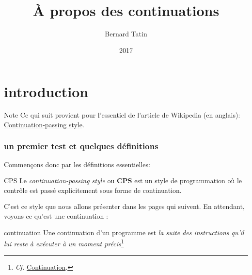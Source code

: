 \documentclass[A4,12pt]{scrartcl}%
\author{Bernard Tatin}
\date{2017}
\title{À propos des continuations}
\begin{document}
\maketitle
{}

\tableofcontents

\part{introduction}


\begin{note}{Note}
Ce qui suit provient pour l'essentiel de l'article de Wikipedia (en anglais): \href{https://en.wikipedia.org/wiki/Continuation-passing_style}{Continuation-passing style}.
\end{note}

\section{un premier test et quelques définitions}
Commençons donc par les définitions essentielles:

\begin{termdefinition}{CPS}
Le \emph{continuation-passing style} ou \textbf{CPS} est un style de programmation où le contrôle est passé explicitement sous forme de continuation.
\end{termdefinition}

C'est ce style que nous allons présenter dans les pages qui suivent. En attendant, voyons ce qu'est une continuation :

\begin{termdefinition}{continuation}
Une continuation d'un programme est \emph{la suite des instructions qu'il lui reste à exécuter à un moment précis}\footnote{\emph{Cf.}
\href{https://fr.wikipedia.org/wiki/Continuation}{Continuation}.}
\end{termdefinition}
\end{document}
